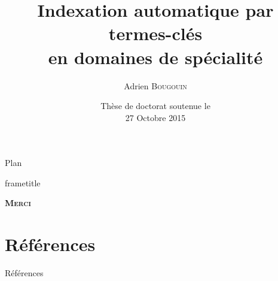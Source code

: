 \documentclass[10pt, xcolor={usenames, dvipsnames}]{beamer}
\title{Indexation automatique par termes-clés\\en domaines de spécialité}
\author{Adrien \textsc{Bougouin}}
\institute{\normalsize{Université de Nantes, LINA}}
\date{Thèse de doctorat soutenue le\\27 Octobre 2015}
\begin{document}
  \begin{frame}
    \titlepage
  \end{frame}

  
  \begin{frame}{Plan}
    \tableofcontents
  \end{frame}
  
  
  
  
  \begin{frame}
    \vfill
    \begin{beamercolorbox}[center,shadow=false,rounded=false]{frametitle} 
      \vspace{.15em}\par
      \Huge{\textbf{\textsc{Merci}}}
      \vspace{.5em}
    \end{beamercolorbox}
    \vfill
  \end{frame}
  \section*{Références}
    \begin{frame}[allowframebreaks]{Références}
      \def\newblock{\hskip .11em plus .33em minus .07em}
      
      
    \end{frame}
\end{document}
